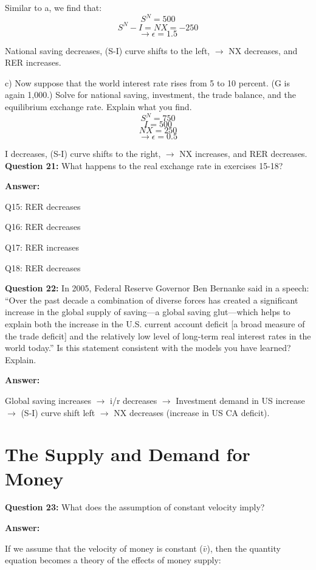 \documentclass[a4paper, 11pt]{article}
\begin{document}
Similar to a, we find that: 
$$S^{N} = 500$$
$$S^{N} - I = NX = -250$$
$$\rightarrow \epsilon = 1.5$$

National saving decreases, (S-I) curve shifts to the left, $\rightarrow$ NX decreases, and RER increases.

c) Now suppose that the world interest rate rises from 5 to 10 percent. (G is again 1,000.) Solve for national saving, investment, the trade balance, and the equilibrium exchange rate. Explain what you find.
$$S^{N} =750$$
$$I = 500$$
$$NX = 250$$
$$\rightarrow \epsilon = 0.5$$

I decreases, (S-I) curve shifts to the right, $\rightarrow$ NX increases, and RER decreases. \\


\textbf{Question 21:} What happens to the real exchange rate in exercises 15-18?

\textbf{Answer:} 

Q15: RER decreases

Q16: RER decreases

Q17: RER increases

Q18:  RER decreases


\textbf{Question 22:} In 2005, Federal Reserve Governor Ben Bernanke said in a speech: “Over the past decade a combination of diverse forces has created a significant increase in the global supply of saving—a global saving glut—which helps to explain both the increase in the U.S. current account deficit [a broad measure of the trade deficit] and the relatively low level of long-term real interest rates in the world today.” Is this statement consistent with the models you have learned? Explain.

\textbf{Answer:} 

Global saving increases $\rightarrow$ i/r decreases $\rightarrow$ Investment demand in US increase $\rightarrow$ (S-I) curve shift left $\rightarrow$ NX decreases (increase in US CA deficit). \\

\section{The Supply and Demand for Money}

\textbf{Question 23:} What does the assumption of constant velocity imply?

\textbf{Answer:} 

If we assume that the velocity of money is constant ($\bar{v}$), then the quantity equation becomes a theory of the effects of money supply:
\end{document}
